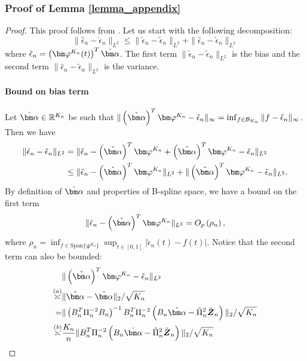 \subsubsection{Proof of Lemma \ref{lemma_appendix}}
\begin{proof}
This proof follows from \cite{huang2004polynomial}.
Let us start with the following decomposition:
\[
\|\hat{\epsilon}_n-\check\epsilon_n\|_{L^2}
\leq
\|\check\epsilon_n-\tilde{\epsilon}_n\|_{L^2}+\|\hat{\epsilon}_n-\tilde{\epsilon}_n\|_{L^2}
\]
where $\tilde \epsilon_n=\left(\vpk(t)\right)^T\tilde{\bm\alpha}$. The first term $\|\check\epsilon_n-\tilde{\epsilon}_n\|_{L^2}$ is
the bias and the second term $\|\hat{\epsilon}_n-\tilde{\epsilon}_n\|_{L^2}$
is the variance.

\paragraph{Bound on bias term}
Let $\bmalpha\in\R^{K_n}$ be such that $\|\left(\bmalpha\right)^T\vpk-\check\epsilon_n\|_{\infty}=\inf_{f\in\mathcal{B}_{K_n}}\|f-\check\epsilon_n\|_{\infty}$. Then we have
\begin{equation*}
\begin{split}
\|\check\epsilon_n-\tilde{\epsilon}_n\|_{L^2}
&=\|\check\epsilon_n-\left(\bmalpha\right)^T\vpk+\left(\bmalpha\right)^T\vpk-\tilde{\epsilon}_n\|_{L^2}
\\&\leq \|\check\epsilon_n-\left(\bmalpha\right)^T\vpk\|_{L^2}+\|\left(\bmalpha\right)^T\vpk-\tilde\epsilon_n\|_{L^2}.
\end{split}
\end{equation*}
By definition of $\bmalpha$ and properties of B-spline space, we have a bound on the first term 
$$\|\check\epsilon_n-\left(\bmalpha\right)^T\vpk\|_{L^2}=\O_p\left(\rho_n\right),$$
where $\rho_n=\inf_{f\in\text{Span}\{\bm\varphi^{K_n}\}}\sup_{t\in[0,1]}|\check\epsilon_n(t)-f(t)|$.
Notice that the second term can also be bounded:
\begin{equation}\label{eq_appendix:bias_first_eq}
\begin{split}
&\|\left(\bmalpha\right)^T\vpk-\tilde\epsilon_n\|_{L^2}
\\\overset{(a)}{\asymp}&\|\bmalpha-\tilde{\bm\alpha}\|_2/\sqrt{K_n}
\\=&\|\left(B_n^T\Pi_n^{-2}B_n\right)^{-1}B_n^T\Pi_n^{-2}\left(B_n\bmalpha-\tilde\Pi_n^{2}\tilde{\boldsymbol{Z}}_n\right)\|_{2}/\sqrt{K_n}
\\\overset{(b)}{\asymp}&\frac{K_n}{n}\|B_n^T\Pi_n^{-2}\left(B_n\bmalpha-\tilde\Pi_n^{2}\tilde{\boldsymbol{Z}}_n\right)\|_2/\sqrt{K_n}

\end{split}
\end{equation}
\end{proof}

